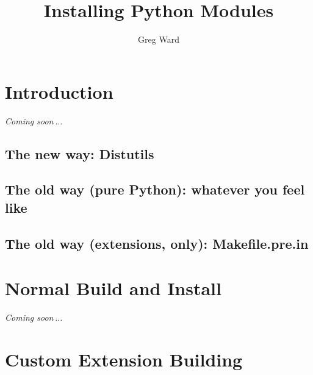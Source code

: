 \documentclass{howto}
\title{Installing Python Modules}
\author{Greg Ward}
\newcommand{\comingsoon}{\emph{Coming soon$\ \ldots$}}
\begin{document}
\maketitle


\tableofcontents

\section{Introduction}
\label{sec:intro}

\comingsoon

\subsection{The new way: Distutils}
\label{sec:new-way}


\subsection{The old way (pure Python): whatever you feel like}
\label{sec:old-way-pure}


\subsection{The old way (extensions, \UNIX{} only): Makefile.pre.in}
\label{sec:old-way-ext}





\section{Normal Build and Install}
\label{sec:normal-install}

\comingsoon


\section{Custom Extension Building}
\label{sec:custom-ext}
\end{document}
